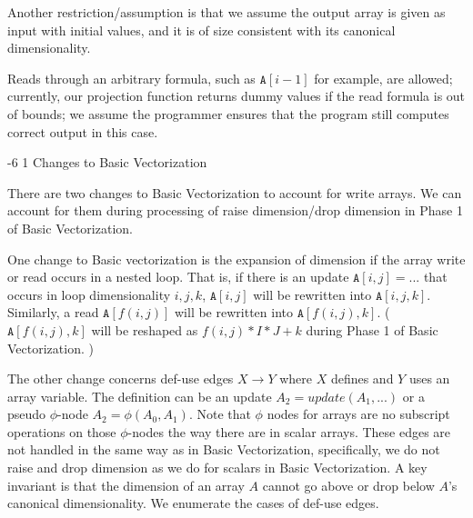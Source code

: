\documentclass[sigconf, screen, natbib=false, dvipsnames, table]{acmart}
\makeatletter
\renewcommand{\subsubsection}{\@startsection{subsubsection}{3}{\z@}%
                        {-6\p@ \@plus -4\p@ \@minus -4\p@}%
                        {1\p@ \@plus 1\p@ \@minus 0\p@}%
                        {\normalfont\normalsize\bfseries\boldmath}}
\theoremstyle{definition}
\makeatother
\begin{document}
Another restriction/assumption is that we assume the output array is given as input with initial values, and it is of size consistent with its canonical dimensionality. 

Reads through an arbitrary formula, such as $\texttt{A}[i-1]$ for example, are allowed; currently, our projection function returns dummy values if the read formula is out of bounds; we assume the programmer ensures that the program still computes correct output in this case.

\subsubsection{Changes to Basic Vectorization}

There are two changes to Basic Vectorization to account for write arrays. We can account for them during processing of raise dimension/drop dimension in Phase 1 of Basic Vectorization.

One change to Basic vectorization is the expansion of dimension if the array write or read occurs in a nested loop. That is, if there is an update $\texttt{A}[i,j] = ...$ that occurs in loop dimensionality $i,j,k$, $\texttt{A}[i,j]$ will be rewritten into $\texttt{A}[i,j,k]$. Similarly, a read $\texttt{A}[f(i,j)]$ will be rewritten into $\texttt{A}[f(i,j),k]$. ($\texttt{A}[f(i,j),k]$ will be reshaped as $f(i,j)*I*J+k$ during Phase 1 of Basic Vectorization. ) 

The other change concerns def-use edges $X \rightarrow Y$ where $X$ defines and $Y$ uses an array variable. The definition can be an update $A_2 = update(A_1,...)$ or a pseudo $\phi$-node $A_2 = \phi(A_0,A_1)$. Note that $\phi$ nodes for arrays are no subscript operations on those $\phi$-nodes the way there are in scalar arrays. These edges are not handled in the same way as in Basic Vectorization, specifically, we do not raise and drop dimension as we do for scalars in Basic Vectorization. A key invariant is that the dimension of an array $A$ cannot go above or drop below $A$'s canonical dimensionality. We enumerate the cases of def-use edges.
\end{document}
